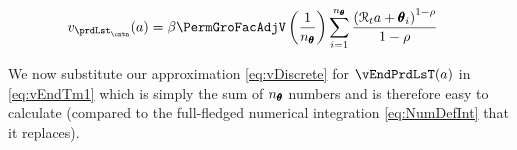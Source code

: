 \lstset{basicstyle=\ttfamily\footnotesize,breaklines=true,language=Python,frame=single}
\nopagebreak

  \begin{equation}\begin{gathered}\begin{aligned}
        \vFunc_{{\prdLst}_\cntn}(\aNrm)  & =   \DiscFac \PermGroFacAdjV\left(\frac{1}{n_{\TranShkEmp}}\right)\sum_{i=1}^{n_{\TranShkEmp}}   \frac{\left(\RNrm_{\prd} \aNrm + \TranShkEmp_{i}\right)^{1-\CRRA}}{1-\CRRA} \label{eq:vDiscrete}
      \end{aligned}\end{gathered}\end{equation}

We now substitute our approximation \eqref{eq:vDiscrete} for $\vEndPrdLsT(a)$ in \eqref{eq:vEndTm1} which is simply the sum of $n_{\pmb{\theta}}$ numbers and is therefore easy to calculate (compared to the full-fledged numerical integration \eqref{eq:NumDefInt} that it replaces).




\begin{comment}
  In the {\SMDSOPntbk} notebook, the section ``Discretization of the Income Shock Distribution'' provides code that instantiates the \texttt{DiscreteApproximation} class defined in the \texttt{resources} module. This class creates a 7-point discretization of the continuous log-normal distribution of transitory shocks to income by utilizing seven points, where the mean value is $-.5 \sigma^2$, and the standard deviation is $\sigma = .5$.

  A close look at the \texttt{DiscreteApproximation} class and its subclasses should convince you that the code is simply a computational implementation of the mathematical description of equiprobable discrete approximation in this section. Moreover, the Python code generates a graph of the discretized distribution depicted in \ref{fig:discreteapprox}.
\end{comment}

